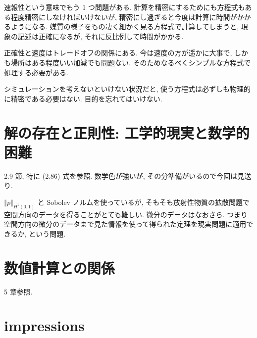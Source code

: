 \documentclass[openany, a4paper, oneside]{book}
\theoremstyle{break}
\theoremstyle{breakdefn}
\newcommand{\norm}[1]{\left\Vert#1\right\Vert}
\begin{document}
速報性という意味でもう 1 つ問題がある.
計算を精密にするためにも方程式もある程度精密にしなければいけないが, 精密にし過ぎると今度は計算に時間がかかるようになる.
媒質の様子をもの凄く細かく見る方程式で計算してしまうと, 現象の記述は正確になるが, それに反比例して時間がかかる.

正確性と速度はトレードオフの関係にある.
今は速度の方が遥かに大事で, しかも場所はある程度いい加減でも問題ない.
そのためなるべくシンプルな方程式で処理する必要がある.

シミュレーションを考えないといけない状況だと, 使う方程式は必ずしも物理的に精密である必要はない.
目的を忘れてはいけない.
\section{解の存在と正則性: 工学的現実と数学的困難}
\label{sec-7-9-10}

\cite{NoborizakaOnishiYamamoto1} 2.9 節, 特に (2.86) 式を参照.
数学色が強いが, その分準備がいるので今回は見送り.

$\norm{p}_{H^1 (0,1)}$ と Sobolev ノルムを使っているが,
そもそも放射性物質の拡散問題で空間方向のデータを得ることがとても難しい.
微分のデータはなおさら.
つまり空間方向の微分のデータまで見た情報を使って得られた定理を現実問題に適用できるか, という問題.
\section{数値計算との関係}
\label{sec-7-9-11}

\cite{KimYamamoto1} 5 章参照.
\section{impressions}
\label{sec-7-9-12}
\end{document}

